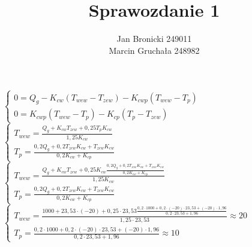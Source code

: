 \documentclass{article}
\title{Sprawozdanie 1}
\author{Jan Bronicki 249011\\
Marcin Gruchała 248982\\}
\date{}
\begin{document}
\maketitle
\begin{center}
    \vspace{1ex}
    $
    \begin{cases}
        0=Q_{g} -K_{cw} (T_{wew} - T_{zew})-K_{cwp} (T_{wew} -T_{p})\\
        0=K_{cwp}(T_{wew}-T_{p})-K_{cp}(T_{p}-T_{zew})
    \end{cases}
    $
    \\
    \vspace{1ex}
    $
    \begin{cases}
        T_{wew}=\frac{Q_{g}+K_{cw}T_{zew}+0,25T_{p}K_{cw}}{1,25K_{cw}}\\
        T_{p}=\frac{0,2Q_{g}+0,2T_{zew}K_{cw}+T_{zew}K_{cw}}{0,2K_{cw}+K_{cp}}
    \end{cases}
    $
    \\
    \vspace{1ex}
    $
    \begin{cases}
        T_{wew}=\frac{Q_{g}+K_{cw}T_{zew}+0,25K_{cw}\frac{0,2Q_{g}+0,2T_{zew}K_{cw}+T_{zew}K_{cw}}{0,2K_{cw}+K_{cp}}}{1,25K_{cw}}\\
        T_{p}=\frac{0,2Q_{g}+0,2T_{zew}K_{cw}+T_{zew}K_{cw}}{0,2K_{cw}+K_{cp}}
    \end{cases}
    $
    \\
    \vspace{1ex}
    $
    \begin{cases}
        T_{wew}=\frac{1000+23,53\cdot(-20)+0,25\cdot23,53\frac{0,2\cdot1000+0,2\cdot(-20)\cdot23,53+(-20)\cdot1,96}{0,2\cdot23,53+1,96}}{1,25\cdot23,53} \approx 20\\
        T_{p}=\frac{0,2\cdot1000+0,2\cdot(-20)\cdot23,53+(-20)\cdot1,96}{0,2\cdot23,53+1,96} \approx 10
    \end{cases}
    $
\end{center}
\end{document}
